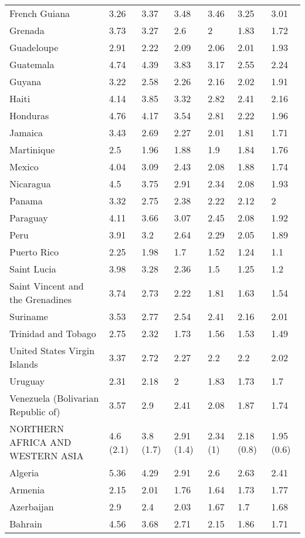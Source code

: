 \begin{longtable}[t]{lllllll}
French Guiana & 3.26 & 3.37 & 3.48 & 3.46 & 3.25 & 3.01\\
Grenada & 3.73 & 3.27 & 2.6 & 2 & 1.83 & 1.72\\
Guadeloupe & 2.91 & 2.22 & 2.09 & 2.06 & 2.01 & 1.93\\
Guatemala & 4.74 & 4.39 & 3.83 & 3.17 & 2.55 & 2.24\\
Guyana & 3.22 & 2.58 & 2.26 & 2.16 & 2.02 & 1.91\\
Haiti & 4.14 & 3.85 & 3.32 & 2.82 & 2.41 & 2.16\\
Honduras & 4.76 & 4.17 & 3.54 & 2.81 & 2.22 & 1.96\\
Jamaica & 3.43 & 2.69 & 2.27 & 2.01 & 1.81 & 1.71\\
Martinique & 2.5 & 1.96 & 1.88 & 1.9 & 1.84 & 1.76\\
Mexico & 4.04 & 3.09 & 2.43 & 2.08 & 1.88 & 1.74\\
Nicaragua & 4.5 & 3.75 & 2.91 & 2.34 & 2.08 & 1.93\\
Panama & 3.32 & 2.75 & 2.38 & 2.22 & 2.12 & 2\\
Paraguay & 4.11 & 3.66 & 3.07 & 2.45 & 2.08 & 1.92\\
Peru & 3.91 & 3.2 & 2.64 & 2.29 & 2.05 & 1.89\\
Puerto Rico & 2.25 & 1.98 & 1.7 & 1.52 & 1.24 & 1.1\\
Saint Lucia & 3.98 & 3.28 & 2.36 & 1.5 & 1.25 & 1.2\\
Saint Vincent and the Grenadines & 3.74 & 2.73 & 2.22 & 1.81 & 1.63 & 1.54\\
Suriname & 3.53 & 2.77 & 2.54 & 2.41 & 2.16 & 2.01\\
Trinidad and Tobago & 2.75 & 2.32 & 1.73 & 1.56 & 1.53 & 1.49\\
United States Virgin Islands & 3.37 & 2.72 & 2.27 & 2.2 & 2.2 & 2.02\\
Uruguay & 2.31 & 2.18 & 2 & 1.83 & 1.73 & 1.7\\
Venezuela (Bolivarian Republic of) & 3.57 & 2.9 & 2.41 & 2.08 & 1.87 & 1.74\\
NORTHERN AFRICA AND WESTERN ASIA & 4.6 (2.1) & 3.8 (1.7) & 2.91 (1.4) & 2.34 (1) & 2.18 (0.8) & 1.95 (0.6)\\
Algeria & 5.36 & 4.29 & 2.91 & 2.6 & 2.63 & 2.41\\
Armenia & 2.15 & 2.01 & 1.76 & 1.64 & 1.73 & 1.77\\
Azerbaijan & 2.9 & 2.4 & 2.03 & 1.67 & 1.7 & 1.68\\
Bahrain & 4.56 & 3.68 & 2.71 & 2.15 & 1.86 & 1.71\\

\end{longtable}
